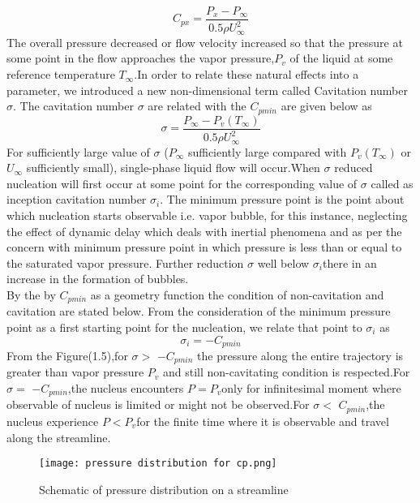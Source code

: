     \begin{equation}
    C_{px} =\frac {P_x-P_{\infty}}{{0.5 \rho {U^{2}_{\infty}}}}
    \end{equation}
   The overall pressure decreased or flow velocity increased so that the pressure at some point in the flow approaches the vapor pressure,$P_v$ of the liquid at some reference temperature $T_{\infty}$.In 
   order to relate these natural effects into a parameter, we introduced a new non-dimensional term called Cavitation number $\sigma$. The cavitation number $\sigma$ are related with the $C_{pmin}$ are 
   given below as 
   \begin{equation}
   \sigma =\frac{{P_{\infty}}-{{P_v}(T_{\infty})}}{{0.5 \rho {U^{2}_{\infty}}}}
   \end{equation}
  For sufficiently large value of $\sigma$ ($P_\infty$ sufficiently large compared with $P_v$$(T_\infty)$ or $U_\infty$ sufficiently small), single-phase liquid flow will occur.When $\sigma$ reduced 
  nucleation will first occur at some point for the corresponding value of $\sigma$ called as inception cavitation number ${\sigma}_i$. The minimum pressure point is the point about which nucleation starts 
  observable i.e. vapor bubble, for this instance, neglecting the effect of dynamic delay which deals with inertial phenomena and as per the concern with minimum pressure point in which pressure is less than or equal to the saturated
  vapor pressure. Further reduction $\sigma$ well below ${\sigma}_i$there in an increase in the formation of bubbles. \\
  By the by $C_{pmin}$ as a geometry function the condition of non-cavitation and cavitation are stated below. From the consideration of the minimum pressure point as a first starting point for the nucleation, we 
  relate that point to ${\sigma}_i$ as 
  \begin{equation}
  {{\sigma}_i} =-C_{pmin}
  \end{equation}
  From the Figure(1.5),for $\sigma >$ $-C_{pmin}$ the pressure along the entire trajectory is greater than vapor pressure $P_v$ and still non-cavitating condition is respected.For $\sigma =$ $-C_{pmin}$,the nucleus encounters $P=P_v$only for infinitesimal moment where observable of nucleus is limited
  or might not be observed.For $\sigma <$ $C_{pmin}$,the nucleus experience $P<P_v$for the finite time where it is observable and travel along the streamline.\\
  \begin{figure}[H]
    \centering
    \texttt{[image: pressure distribution for cp.png]}
    \caption{Schematic of pressure distribution on a streamline}
    \label{fig:fig5}
\end{figure}

